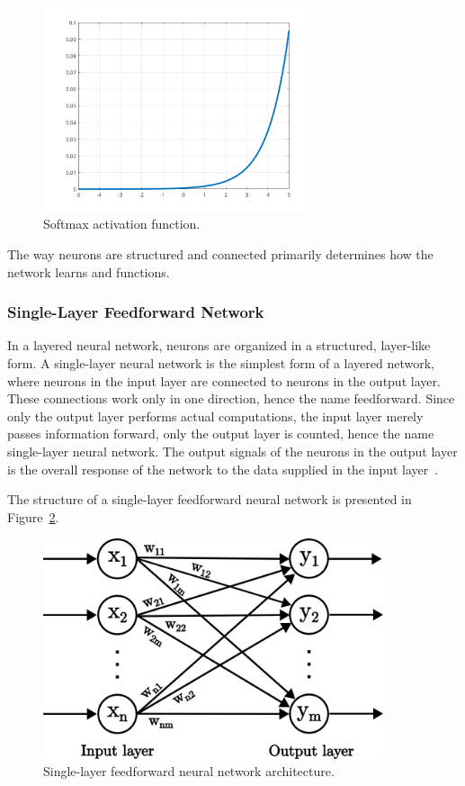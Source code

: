 \documentclass[a4paper,oneside,onecolumn,12pt]{book}
\begin{document}
\begin{itemize}
		\begin{figure}[H]
		\begin{center}
			\includegraphics[keepaspectratio,width=8cm]{kep/softmax.png}
			\caption{Softmax activation function.}
			\label{fig:softmax}
		\end{center}
		\end{figure}
	\end{itemize}

	The way neurons are structured and connected primarily determines how the network learns and functions.

		\subsubsection{Single-Layer Feedforward Network}
		In a layered neural network, neurons are organized in a structured, layer-like form. A single-layer neural network is the simplest form of a layered network, where neurons in the input layer are connected to neurons in the output layer. These connections work only in one direction, hence the name feedforward. Since only the output layer performs actual computations, the input layer merely passes information forward, only the output layer is counted, hence the name single-layer neural network. The output signals of the neurons in the output layer is the overall response of the network to the data supplied in the input layer~\cite{NNACF}.
		
		The structure of a single-layer feedforward neural network is presented in Figure~\ref{fig:single-layer feedforward nn}.
		\begin{figure}[H]
		\begin{center}
			\includegraphics[keepaspectratio,width=10cm]{kep/single_layer_feedforward_nn.png}
			\caption{Single-layer feedforward neural network architecture.}
			\label{fig:single-layer feedforward nn}
		\end{center}
		\end{figure}
\end{document}
